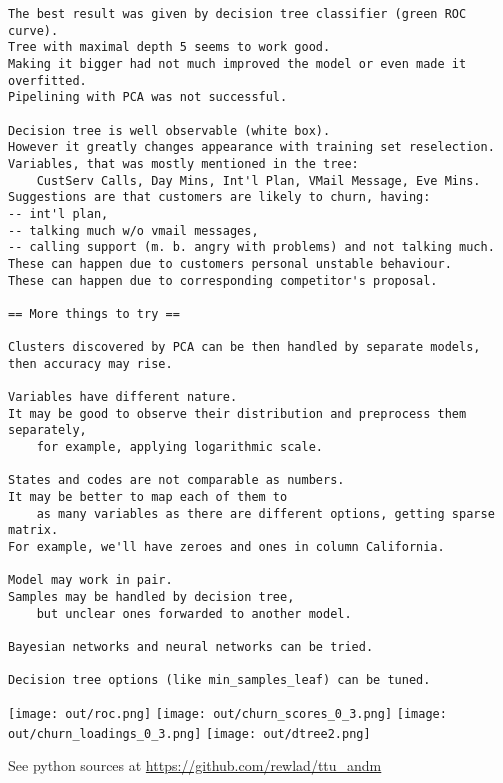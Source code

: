 \documentclass{article}
\begin{document}
\begin{verbatim}
The best result was given by decision tree classifier (green ROC curve).
Tree with maximal depth 5 seems to work good.
Making it bigger had not much improved the model or even made it overfitted.
Pipelining with PCA was not successful.

Decision tree is well observable (white box).
However it greatly changes appearance with training set reselection.
Variables, that was mostly mentioned in the tree:
    CustServ Calls, Day Mins, Int'l Plan, VMail Message, Eve Mins.
Suggestions are that customers are likely to churn, having:
-- int'l plan,
-- talking much w/o vmail messages,
-- calling support (m. b. angry with problems) and not talking much.
These can happen due to customers personal unstable behaviour.
These can happen due to corresponding competitor's proposal.

== More things to try ==

Clusters discovered by PCA can be then handled by separate models, 
then accuracy may rise.

Variables have different nature. 
It may be good to observe their distribution and preprocess them separately,
    for example, applying logarithmic scale.

States and codes are not comparable as numbers.
It may be better to map each of them to 
    as many variables as there are different options, getting sparse matrix.
For example, we'll have zeroes and ones in column California. 

Model may work in pair.
Samples may be handled by decision tree, 
    but unclear ones forwarded to another model.

Bayesian networks and neural networks can be tried.

Decision tree options (like min_samples_leaf) can be tuned.

\end{verbatim}

\clearpage

\centering
\texttt{[image: out/roc.png]}
\texttt{[image: out/churn\_scores\_0\_3.png]}
\texttt{[image: out/churn\_loadings\_0\_3.png]}
\clearpage
\texttt{[image: out/dtree2.png]}


\clearpage

See python sources at \url{https://github.com/rewlad/ttu_andm}


\end{document}
